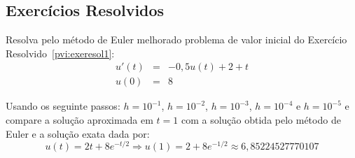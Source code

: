 \subsection*{Exercícios Resolvidos}
\begin{exeresol}\label{pvi:exeresol1_euler_melhorado} Resolva pelo método de Euler melhorado problema de valor inicial do Exercício Resolvido~\ref{pvi:exeresol1}:
\begin{eqnarray}
     u'(t)&=& -0,5u(t)+2+t\\
            u(0) &=&  8
\end{eqnarray}

Usando os seguinte passos: $h=10^{-1}$, $h=10^{-2}$, $h=10^{-3}$, $h=10^{-4}$ e $h=10^{-5}$ e compare a solução aproximada em $t=1$ com a solução obtida pelo método de Euler e a solução exata dada por:
\begin{equation}
     u(t) = 2t+8e^{-t/2} \Longrightarrow u(1)=2+8e^{-1/2} \approx 6,85224527770107
\end{equation}
\end{exeresol}
